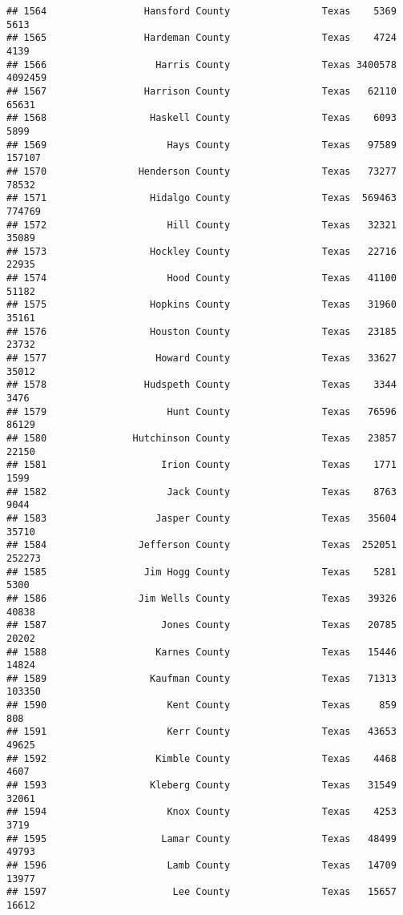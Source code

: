 \documentclass[
]{article}
\begin{document}
\begin{verbatim}
## 1564                 Hansford County                Texas    5369    5613
## 1565                 Hardeman County                Texas    4724    4139
## 1566                   Harris County                Texas 3400578 4092459
## 1567                 Harrison County                Texas   62110   65631
## 1568                  Haskell County                Texas    6093    5899
## 1569                     Hays County                Texas   97589  157107
## 1570                Henderson County                Texas   73277   78532
## 1571                  Hidalgo County                Texas  569463  774769
## 1572                     Hill County                Texas   32321   35089
## 1573                  Hockley County                Texas   22716   22935
## 1574                     Hood County                Texas   41100   51182
## 1575                  Hopkins County                Texas   31960   35161
## 1576                  Houston County                Texas   23185   23732
## 1577                   Howard County                Texas   33627   35012
## 1578                 Hudspeth County                Texas    3344    3476
## 1579                     Hunt County                Texas   76596   86129
## 1580               Hutchinson County                Texas   23857   22150
## 1581                    Irion County                Texas    1771    1599
## 1582                     Jack County                Texas    8763    9044
## 1583                   Jasper County                Texas   35604   35710
## 1584                Jefferson County                Texas  252051  252273
## 1585                 Jim Hogg County                Texas    5281    5300
## 1586                Jim Wells County                Texas   39326   40838
## 1587                    Jones County                Texas   20785   20202
## 1588                   Karnes County                Texas   15446   14824
## 1589                  Kaufman County                Texas   71313  103350
## 1590                     Kent County                Texas     859     808
## 1591                     Kerr County                Texas   43653   49625
## 1592                   Kimble County                Texas    4468    4607
## 1593                  Kleberg County                Texas   31549   32061
## 1594                     Knox County                Texas    4253    3719
## 1595                    Lamar County                Texas   48499   49793
## 1596                     Lamb County                Texas   14709   13977
## 1597                      Lee County                Texas   15657   16612

\end{verbatim}
\end{document}
